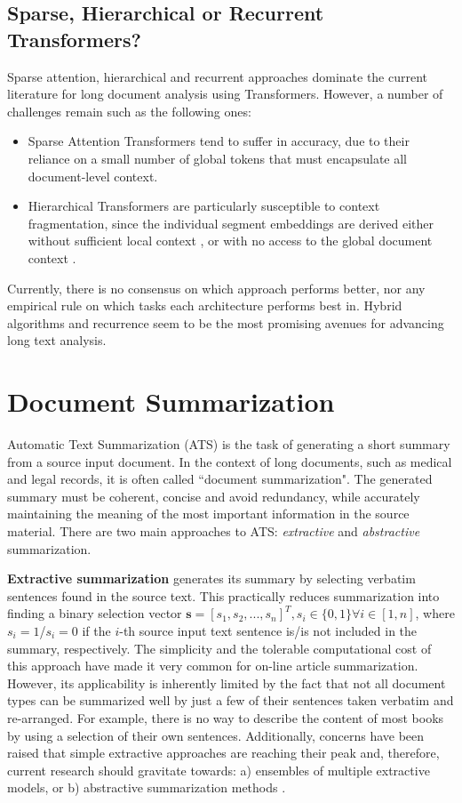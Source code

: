 \documentclass[preprint,review,10pt]{elsarticle}
\begin{document}
	\subsection{Sparse, Hierarchical or Recurrent Transformers?}
	Sparse attention, hierarchical and recurrent approaches dominate the current literature for long document analysis using Transformers. However, a number of challenges remain such as the following ones:
	\begin{itemize}
		\item Sparse Attention Transformers tend to suffer in accuracy, due to their reliance on a small number of global tokens that must encapsulate all document-level context.
		\item Hierarchical Transformers are particularly susceptible to context fragmentation, since the individual segment embeddings are derived either without sufficient local context \cite{dai}, or with no access to the global document context \cite{qi}.
	\end{itemize}
	Currently, there is no consensus on which approach performs better, nor any empirical rule on which tasks each architecture performs best in. Hybrid algorithms and recurrence seem to be the most promising avenues for advancing long text analysis.
	
	\section{Document Summarization}
	\label{sec::Summarization}
	Automatic Text Summarization (ATS) is the task of generating a short summary from a source input document. In the context of long documents, such as medical and legal records, it is often called ``document summarization". The generated summary must be coherent, concise and avoid redundancy, while accurately maintaining the meaning of the most important information in the source material. There are two main approaches to ATS: \textit{extractive} and \textit{abstractive} summarization.
	
	\textbf{Extractive summarization} generates its summary by selecting verbatim sentences found in the source text. This practically reduces summarization into finding a binary selection vector $\mathbf{s} = [s_1, s_2,..., s_n]^T, s_i \in \{0,1\} \forall i \in [1,n]$, where $s_i = 1$/$s_i = 0$ if the $i$-th source input text sentence is/is not included in the summary, respectively. The simplicity and the tolerable computational cost of this approach have made it very common for on-line article summarization. However, its applicability is inherently limited by the fact that not all document types can be summarized well by just a few of their sentences taken verbatim and re-arranged. For example, there is no way to describe the content of most books by using a selection of their own sentences. Additionally, concerns have been raised that simple extractive approaches are reaching their peak and, therefore, current research should gravitate towards: a) ensembles of multiple extractive models, or b) abstractive summarization methods \cite{mehta}.
	
\end{document}
